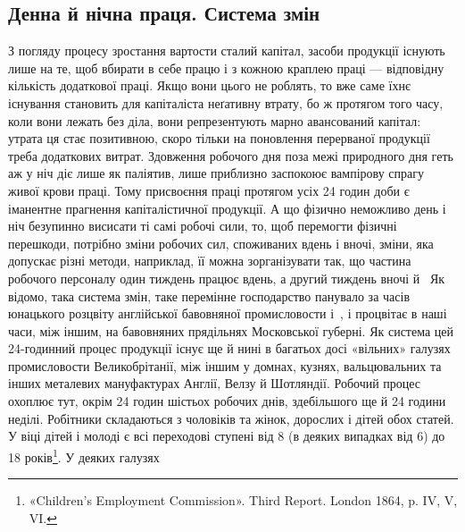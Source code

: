 
\subsection{Денна й нічна праця. Система змін}

З погляду процесу зростання вартости сталий капітал, засоби
продукції існують лише на те, щоб вбирати в себе працю і з кожною
краплею праці — відповідну кількість додаткової праці.
Якщо вони цього не роблять, то вже саме їхнє існування становить
для капіталіста неґативну втрату, бо ж протягом того часу,
коли вони лежать без діла, вони репрезентують марно авансований
капітал: утрата ця стає позитивною, скоро тільки на поновлення
перерваної продукції треба додаткових витрат. Здовження
робочого дня поза межі природного дня геть аж у ніч діє
лише як паліятив, лише приблизно заспокоює вампірову спрагу
живої крови праці. Тому присвоєння праці протягом усіх 24 годин
доби є іманентне прагнення капіталістичної продукції. А що
фізично неможливо день і ніч безупинно висисати ті самі робочі
сили, то, щоб перемогти фізичні перешкоди, потрібно зміни робочих
сил, споживаних вдень і вночі, зміни, яка допускає різні
методи, наприклад, її можна зорганізувати так, що частина робочого
персоналу один тиждень працює вдень, а другий тиждень
вночі й~ Як відомо, така система змін, таке перемінне господарство
панувало за часів юнацького розцвіту англійської бавовняної
промисловости і~, і процвітає в наші часи, між
іншим, на бавовняних прядільнях Московської губерні. Як система
цей 24-годинний процес продукції існує ще й нині в багатьох
досі «вільних» галузях промисловости Великобрітанії, між іншим
у домнах, кузнях, вальцювальних та інших металевих мануфактурах
Англії, Велзу й Шотляндії. Робочий процес охоплює тут,
окрім 24 годин шістьох робочих днів, здебільшого ще й 24 години
неділі. Робітники складаються з чоловіків та жінок, дорослих
і дітей обох статей. У віці дітей і молоді є всі переходові ступені
від 8 (в деяких випадках від 6) до 18 років\footnote{
«Children’s Employment Commission». Third Report. London
1864, p. IV, V, VI.
}. У деяких галузях
